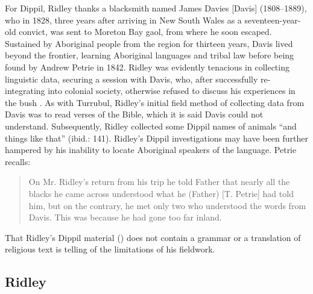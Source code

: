 For Dippil, Ridley thanks a blacksmith named James Davies [Davis] (1808--1889), who in 1828, three years after arriving in New South Wales as a seventeen-year-old convict, was sent to Moreton Bay gaol, from where he soon escaped. Sustained by Aboriginal people from the region for thirteen years, Davis lived beyond the frontier, learning Aboriginal languages and tribal law before being found by Andrew Petrie in 1842. Ridley was evidently tenacious in collecting linguistic data, securing a session with Davis, who, after successfully re-integrating into colonial society, otherwise refused to discuss his experiences in the bush \citep[140--141]{petrie_tom_1904}. As with Turrubul, Ridley’s initial field method of collecting data from Davis was to read verses of the Bible, which it is said Davis could not understand. Subsequently, Ridley collected some Dippil names of animals “and things like that” (ibid.: 141). Ridley’s Dippil investigations may have been further hampered by his inability to locate Aboriginal speakers of the language. Petrie recalls:

\begin{quote}
    On Mr. Ridley’s return from his trip he told Father that nearly all the blacks he came across understood what he (Father) [T. Petrie] had told him, but on the contrary, he met only two who understood the words from Davis. This was because he had gone too far inland. \citep[141]{petrie_tom_1904}
\end{quote}

That Ridley’s Dippil material (\citeyear[47--57]{ridley_gurre_1856}) does not contain a grammar or a translation of religious text is telling of the limitations of his fieldwork.

\subsection{Ridley \citeyearpar{ridley_kamilaroi_1875}}
\label{sec:key:4.5.3}

